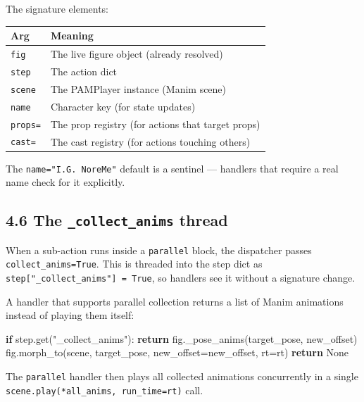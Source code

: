 \documentclass[
  12pt,
  letterpaper,
]{book}
\newenvironment{Shaded}{}{}
\newcommand{\ControlFlowTok}[1]{\textcolor[rgb]{0.00,0.44,0.13}{\textbf{#1}}}
\newcommand{\NormalTok}[1]{#1}
\newcommand{\OperatorTok}[1]{\textcolor[rgb]{0.40,0.40,0.40}{#1}}
\newcommand{\StringTok}[1]{\textcolor[rgb]{0.25,0.44,0.63}{#1}}
\newcommand{\VariableTok}[1]{\textcolor[rgb]{0.10,0.09,0.49}{#1}}
\begin{document}
The signature elements:

\begin{longtable}[]{@{}ll@{}}
\toprule\noalign{}
Arg & Meaning \\
\midrule\noalign{}
\endhead
\bottomrule\noalign{}
\endlastfoot
\texttt{fig} & The live figure object (already resolved) \\
\texttt{step} & The action dict \\
\texttt{scene} & The PAMPlayer instance (Manim scene) \\
\texttt{name} & Character key (for state updates) \\
\texttt{props=} & The prop registry (for actions that target props) \\
\texttt{cast=} & The cast registry (for actions touching others) \\
\end{longtable}

The \texttt{name="I.G.\ NoreMe"} default is a sentinel --- handlers that
require a real name check for it explicitly.

\subsection{\texorpdfstring{4.6 The \texttt{\_collect\_anims}
thread}{4.6 The \_collect\_anims thread}}\label{the-_collect_anims-thread}

When a sub-action runs inside a \texttt{parallel} block, the dispatcher
passes \texttt{collect\_anims=True}. This is threaded into the step dict
as \texttt{step{[}"\_collect\_anims"{]}\ =\ True}, so handlers see it
without a signature change.

A handler that supports parallel collection returns a list of Manim
animations instead of playing them itself:

\begin{Shaded}
\begin{Highlighting}[]
\ControlFlowTok{if}\NormalTok{ step.get(}\StringTok{"\_collect\_anims"}\NormalTok{):}
    \ControlFlowTok{return}\NormalTok{ fig.\_pose\_anims(target\_pose, new\_offset)}
\NormalTok{fig.morph\_to(scene, target\_pose, new\_offset}\OperatorTok{=}\NormalTok{new\_offset, rt}\OperatorTok{=}\NormalTok{rt)}
\ControlFlowTok{return} \VariableTok{None}
\end{Highlighting}
\end{Shaded}

The \texttt{parallel} handler then plays all collected animations
concurrently in a single \texttt{scene.play(*all\_anims,\ run\_time=rt)}
call.
\end{document}
